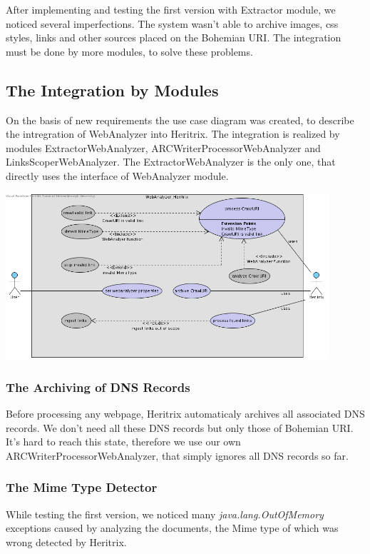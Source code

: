 \documentclass[11pt,a4paper]{article}
\begin{document}
After implementing and testing the first version with Extractor module, we noticed several imperfections. The system wasn't able to archive images, css styles, links and other sources placed on the Bohemian URI. The integration must be done by more modules, to solve these problems.

\subsection{The Integration by Modules}
On the basis of new requirements the use case diagram was created, to describe the intregration of WebAnalyzer into Heritrix. The integration is realized by modules ExtractorWebAnalyzer, ARCWriterProcessorWebAnalyzer and LinksScoperWebAnalyzer. The ExtractorWebAnalyzer is the only one, that directly uses the interface of WebAnalyzer module.

\begin{center}
\includegraphics[width=120mm]{usecase1.png}
\end{center}

\subsubsection{The Archiving of DNS Records}
Before processing any webpage, Heritrix automaticaly archives all asso\-cia\-ted DNS records. We don't need all these DNS records but only those of Bohemian URI. It's hard to reach this state, therefore we use our own ARCWriterProcessorWebAnalyzer, that simply ignores all DNS records so far.

\subsubsection{The Mime Type Detector}
While testing the first version, we noticed many \emph{java.lang.OutOfMemory} exceptions caused by analyzing the documents, the Mime type of which was wrong detected by Heritrix.
\end{document}
